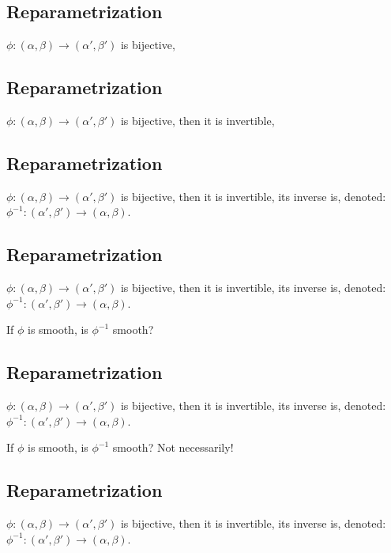 \documentclass[twocolumn,20pt,fleqn]{extarticle}
\theoremstyle{plain}
\theoremstyle{definition}
\theoremstyle{remark}
\begin{document}
\clearpage


\subsection{Reparametrization}
$\phi: (\alpha,\beta) \to (\alpha',\beta')$ is bijective,


\clearpage


\subsection{Reparametrization}
$\phi: (\alpha,\beta) \to (\alpha',\beta')$ is bijective, then it is invertible,


\clearpage


\subsection{Reparametrization}
$\phi: (\alpha,\beta) \to (\alpha',\beta')$ is bijective, then it is invertible, its inverse is,
denoted: $\phi^{-1} : (\alpha',\beta') \to (\alpha,\beta)$.




\clearpage


\subsection{Reparametrization}
$\phi: (\alpha,\beta) \to (\alpha',\beta')$ is bijective, then it is invertible, its inverse is,
denoted: $\phi^{-1} : (\alpha',\beta') \to (\alpha,\beta)$.

If $\phi$ is smooth, is $\phi^{-1}$ smooth?


\clearpage


\subsection{Reparametrization}
$\phi: (\alpha,\beta) \to (\alpha',\beta')$ is bijective, then it is invertible, its inverse is,
denoted: $\phi^{-1} : (\alpha',\beta') \to (\alpha,\beta)$.

If $\phi$ is smooth, is $\phi^{-1}$ smooth? Not necessarily!






\clearpage


\subsection{Reparametrization}
$\phi: (\alpha,\beta) \to (\alpha',\beta')$ is bijective, then it is invertible, its inverse is,
denoted: $\phi^{-1} : (\alpha',\beta') \to (\alpha,\beta)$.
\end{document}
